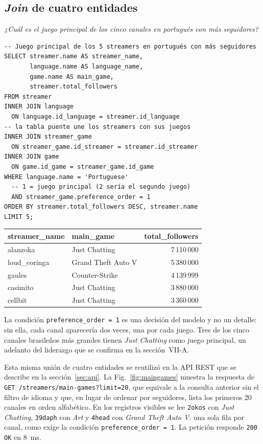 \documentclass[conference]{IEEEtran}
\begin{document}
\subsection{\emph{Join} de cuatro entidades}
\emph{¿Cuál es el juego principal de los cinco canales en portugués con más seguidores?}
\begin{lstlisting}
-- Juego principal de los 5 streamers en portugués con más seguidores
SELECT streamer.name AS streamer_name,
       language.name AS language_name,
       game.name AS main_game,
       streamer.total_followers
FROM streamer
INNER JOIN language
  ON language.id_language = streamer.id_language
-- la tabla puente une los streamers con sus juegos
INNER JOIN streamer_game
  ON streamer_game.id_streamer = streamer.id_streamer
INNER JOIN game
  ON game.id_game = streamer_game.id_game
WHERE language.name = 'Portuguese'
  -- 1 = juego principal (2 sería el segundo juego)
  AND streamer_game.preference_order = 1
ORDER BY streamer.total_followers DESC, streamer.name
LIMIT 5;
\end{lstlisting}
\begin{table}[!h]
\centering\footnotesize
\begin{tabular}{@{}llr@{}}
\toprule
streamer\_name & main\_game & total\_followers \\
\midrule
alanzoka & Just Chatting & 7\,110\,000 \\
loud\_coringa & Grand Theft Auto V & 5\,380\,000 \\
gaules & Counter-Strike & 4\,139\,999 \\
casimito & Just Chatting & 3\,880\,000 \\
cellbit & Just Chatting & 3\,360\,000 \\
\bottomrule
\end{tabular}
\end{table}
La condición \texttt{preference\_order = 1} es una decisión del modelo y no un detalle: sin ella, cada canal aparecería dos veces, una por cada juego. Tres de los cinco canales brasileños más grandes tienen \emph{Just Chatting} como juego principal, un adelanto del liderazgo que se confirma en la sección~VII-A.

Esta misma unión de cuatro entidades se reutilizó en la API REST que se describe en la sección~\ref{sec:api}. La Fig.~\ref{fig:maingames} muestra la respuesta de \texttt{GET /streamers/main-games?limit=20}, que equivale a la consulta anterior sin el filtro de idioma y que, en lugar de ordenar por seguidores, lista los primeros 20 canales en orden alfabético. En los registros visibles se lee \texttt{2okos} con \emph{Just Chatting}, \texttt{39daph} con \emph{Art} y \texttt{4head} con \emph{Grand Theft Auto V}: una sola fila por canal, como exige la condición \texttt{preference\_order = 1}. La petición responde \texttt{200 OK} en 8~ms.
\end{document}
